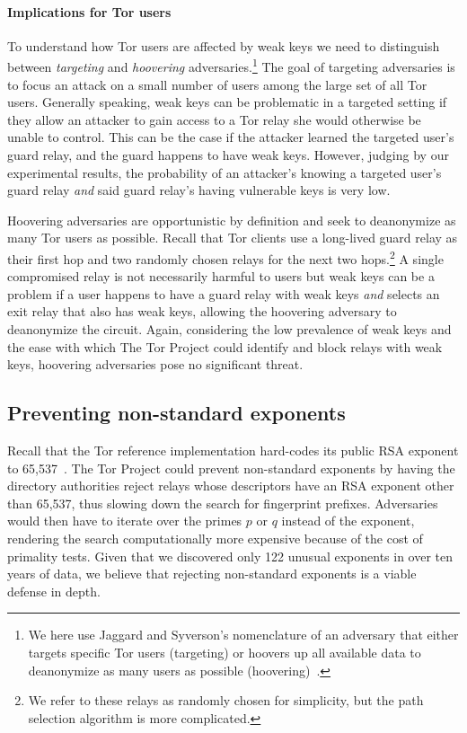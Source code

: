 \paragraph{Implications for Tor users}
To understand how Tor users are affected by weak keys we need to distinguish
between \emph{targeting} and \emph{hoovering} adversaries.\footnote{We here use
Jaggard and Syverson's nomenclature of an adversary that either targets
specific Tor users (targeting) or hoovers up all available data to
deanonymize as many users as possible (hoovering)~\cite{Jaggard2017a}.}
The goal of targeting adversaries is to focus an attack on a small number of
users among the large set of all Tor users.  Generally speaking, weak keys can
be problematic in a targeted setting if they allow an attacker to gain access to
a Tor relay she would otherwise be unable to control.  This can be the case if
the attacker learned the targeted user's guard relay, and the guard happens
to have weak keys.  However, judging by our experimental results, the
probability of an attacker's knowing a targeted user's guard relay \emph{and} 
said guard relay's having vulnerable keys is very low.

Hoovering adversaries are opportunistic by definition and seek to deanonymize as
many Tor users as possible.  Recall that Tor clients use a long-lived guard
relay as their first hop and two randomly chosen relays for the next two
hops.\footnote{We refer to these relays as randomly chosen for simplicity, but
the path selection algorithm is more complicated.}  A single compromised relay
is not necessarily harmful to users but weak keys can be a problem if a user
happens to have a guard relay with weak keys \emph{and} selects an exit relay
that also has weak keys, allowing the hoovering adversary to deanonymize the
circuit.  Again, considering the low prevalence of weak keys and the ease with
which The Tor Project could identify and block relays with weak keys, hoovering
adversaries pose no significant threat.

\subsection{Preventing non-standard exponents}
Recall that the Tor reference implementation hard-codes its public RSA exponent
to 65,537~\cite[\S~0.3]{torspec}.  The Tor Project could prevent non-standard
exponents by having the directory authorities reject relays whose descriptors
have an RSA exponent other than 65,537, thus slowing down the search for
fingerprint prefixes.  Adversaries would then have to iterate over the primes
$p$ or $q$ instead of the exponent, rendering the search computationally
more expensive because of the cost of primality tests.  Given that we discovered
only 122 unusual exponents in over ten years of data, we believe that rejecting
non-standard exponents is a viable defense in depth.


